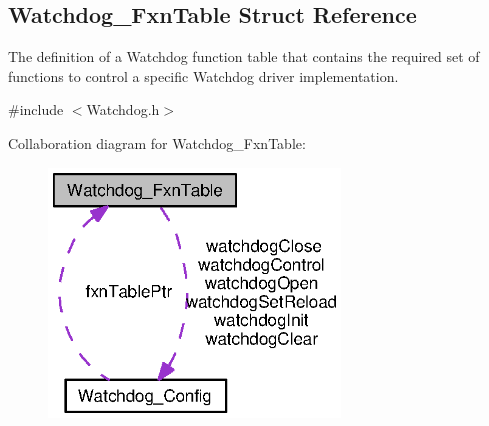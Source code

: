 \subsection{Watchdog\-\_\-\-Fxn\-Table Struct Reference}
\label{struct_watchdog___fxn_table}


The definition of a Watchdog function table that contains the required set of functions to control a specific Watchdog driver implementation.  




{\ttfamily \#include $<$Watchdog.\-h$>$}



Collaboration diagram for Watchdog\-\_\-\-Fxn\-Table\-:
\nopagebreak
\begin{figure}[H]
\begin{center}
\leavevmode
\includegraphics[width=220pt]{struct_watchdog___fxn_table__coll__graph}
\end{center}
\end{figure}

